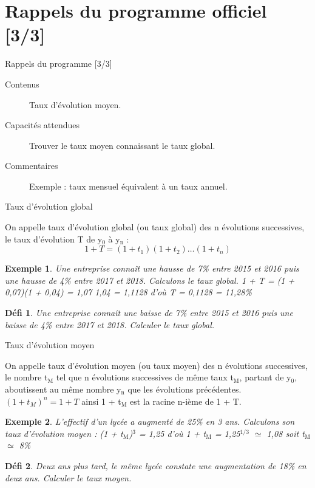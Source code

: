 \documentclass[presentation]{beamer}
\newtheorem{defi}{Défi}[section]
\newtheorem{exe}{Exemple}[section]
\begin{document}
\section{Rappels du programme officiel [3/3]}
\label{sec:org41decc9}
\begin{frame}[label={sec:org5db3b5e}]{Rappels du programme [3/3]}
\begin{description}
\item[{Contenus}] Taux d'évolution moyen.
\item[{Capacités attendues}] Trouver le taux moyen connaissant le taux global.
\item[{Commentaires}] Exemple : taux mensuel équivalent à un taux annuel.
\end{description}
\end{frame}
\begin{frame}[label={sec:org59ea5cc}]{Taux d'évolution global}
\begin{definition}
On appelle \alert{taux d'évolution global} (ou \alert{taux global}) des n
évolutions successives, le taux d'évolution T de y\(_{\text{0}}\) à y\(_{\text{n}}\) :
\[1 + T = (1 + t_1)(1 + t_2)\dots (1 + t_n)\]
\end{definition}

\begin{exe}
Une entreprise connaît une hausse de 7\% entre 2015 et 2016 puis une
hausse de 4\% entre 2017 et 2018. Calculons le taux global.
1 + T = (1 + 0,07)(1 + 0,04) = 1,07\texttimes{} 1,04 = 1,1128 d'où T =
0,1128 = 11,28\%
\end{exe}

\begin{defi}
Une entreprise connaît une baisse de 7\% entre 2015 et 2016 puis une
baisse de 4\% entre 2017 et 2018. Calculer le taux global.
\end{defi}
\end{frame}
\begin{frame}[label={sec:orgc1e8a78}]{Taux d'évolution moyen}
\begin{definition}
On appelle \alert{taux d'évolution moyen} (ou \alert{taux moyen}) des n
évolutions successives, le nombre t\(_{\text{M}}\) tel que n évolutions
successives de même taux t\(_{\text{M}}\), partant de y\(_{\text{0}}\), aboutissent au même
nombre y\(_{\text{n}}\) que les évolutions précédentes. 
\((1+t_M)^n = 1 + T\) ainsi 1 + t\(_{\text{M}}\) est la racine n-ième de 1 + T.
\end{definition}

\begin{exe}
L'effectif d'un lycée a augmenté de 25\% en 3 ans. Calculons son
taux d'évolution moyen : (1 + t\(_{\text{M}}\))\(^{\text{3}}\) = 1,25 d'où 1 + t\(_{\text{M}}\) =
1,25\(^{\text{1/3}}\) \(\simeq\) 1,08 soit t\(_{\text{M}}\) \(\simeq\) 8\%
\end{exe}

\begin{defi}
Deux ans plus tard, le même lycée constate une augmentation de 18\%
en deux ans. Calculer le taux moyen.
\end{defi}
\end{frame}
\end{document}
